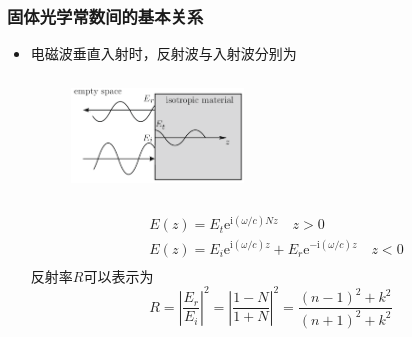 \frame
{
	\frametitle{固体光学常数间的基本关系}
	\begin{itemize}
		\item 电磁波垂直入射时，反射波与入射波分别为
\begin{figure}[h!]
\centering
\vspace*{-0.4in}
\includegraphics[height=1.2in,width=1.8in,viewport=0 0 750 600,clip]{Figures/Optic-reflect.png}
\caption{\fontsize{5.5pt}{4.2pt}}%
\label{Optic-reflect}
\end{figure} 
			\begin{displaymath}
				\begin{aligned}
					&E(z)=E_t\mathrm{e}^{\mathrm{i}(\omega/c)Nz}\quad z>0\\
					&E(z)=E_i\mathrm{e}^{\mathrm{i}(\omega/c)z}+E_r\mathrm{e}^{-\mathrm{i}(\omega/c)z}\quad z<0\\
				\end{aligned}
			\end{displaymath}
			反射率$R$可以表示为
			\begin{displaymath}
				R=\left|\frac{E_r}{E_i}\right|^2=\left|\frac{1-N}{1+N}\right|^2=\frac{(n-1)^2+k^2}{(n+1)^2+k^2}
			\end{displaymath}
	\end{itemize}
}

